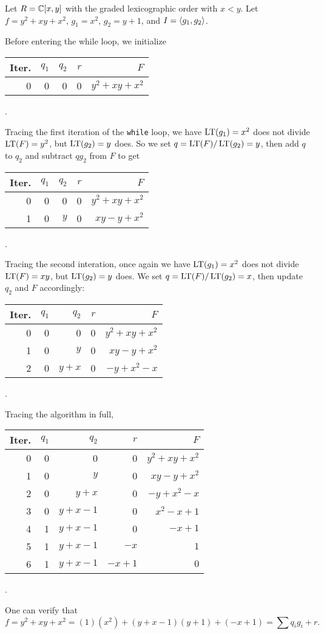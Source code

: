 \begin{example}
  Let $R = \mathbb{C}[x,y]$ with the graded lexicographic order with $x < y$.
  Let $f = y^2 + xy + x^2$, $g_1 = x^2$, $g_2 = y + 1$, and $I = \left\langle g_1, g_2 \right\rangle$.
  
  Before entering the while loop, we initialize
  \begin{center}
    \begin{tabular}{r|rrrr}
      Iter. & $q_1$ & $q_2$ & $r$ & $F$ \\
      \hline
      0 & 0 & 0 & 0 & $y^2 + xy + x^2$
    \end{tabular}.
  \end{center}
  Tracing the first iteration of the {\tt while} loop, we have $\operatorname{LT}(g_1) = x^2$ does not divide $\operatorname{LT}(F) = y^2$, but $\operatorname{LT}(g_2) = y$ does.
  So we set $q = \operatorname{LT}(F)/\operatorname{LT}(g_2) = y$, then add $q$ to $q_2$ and subtract $qg_2$ from $F$ to get
  \begin{center}
    \begin{tabular}{r|rrrr}
      Iter. & $q_1$ & $q_2$ & $r$ & $F$ \\
      \hline
      0 & 0 &   0 & 0 & $y^2 + xy + x^2$ \\
      1 & 0 & $y$ & 0 &   $xy - y + x^2$
    \end{tabular}.
  \end{center}
  Tracing the second interation, once again we have $\operatorname{LT}(g_1) = x^2$ does not divide $\operatorname{LT}(F) = xy$, but $\operatorname{LT}(g_2) = y$ does.
  We set $q = \operatorname{LT}(F)/\operatorname{LT}(g_2) = x$, then update $q_2$ and $F$ accordingly:
  \begin{center}
    \begin{tabular}{r|rrrr}
      Iter. & $q_1$ & $q_2$ & $r$ & $F$ \\
      \hline
      0 & 0 &       0 & 0 & $y^2 + xy + x^2$ \\
      1 & 0 &     $y$ & 0 &   $xy - y + x^2$ \\
      2 & 0 & $y + x$ & 0 &   $-y + x^2 - x$
    \end{tabular}.
  \end{center}
  Tracing the algorithm in full,
  \begin{center}
    \begin{tabular}{r|rrrr}
      Iter. & $q_1$ & $q_2$ & $r$ & $F$ \\
      \hline
      0 & 0 &           0 &        0 & $y^2 + xy + x^2$ \\
      1 & 0 &         $y$ &        0 &   $xy - y + x^2$ \\
      2 & 0 &     $y + x$ &        0 &   $-y + x^2 - x$ \\
      3 & 0 & $y + x - 1$ &        0 &    $x^2 - x + 1$ \\
      4 & 1 & $y + x - 1$ &        0 &         $-x + 1$ \\
      5 & 1 & $y + x - 1$ &     $-x$ &              $1$ \\
      6 & 1 & $y + x - 1$ & $-x + 1$ &              $0$
    \end{tabular}.
  \end{center}
  One can verify that
  \[ f = y^2 + xy + x^2 = (1)(x^2) + (y + x - 1)(y + 1) + (-x + 1) = \sum q_i g_i + r. \]
\end{example}

